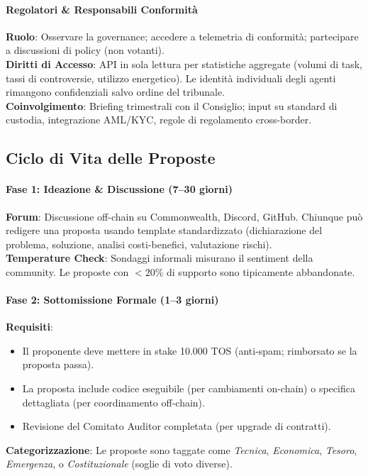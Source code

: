 \documentclass[11pt]{article}
\begin{document}
\begin{itemize}[noitemsep]
\paragraph{Regolatori \& Responsabili Conformità}
\textbf{Ruolo}: Osservare la governance; accedere a telemetria di conformità; partecipare a discussioni di policy (non votanti).\\
\textbf{Diritti di Accesso}: API in sola lettura per statistiche aggregate (volumi di task, tassi di controversie, utilizzo energetico). Le identità individuali degli agenti rimangono confidenziali salvo ordine del tribunale.\\
\textbf{Coinvolgimento}: Briefing trimestrali con il Consiglio; input su standard di custodia, integrazione AML/KYC, regole di regolamento cross-border.

\subsection{Ciclo di Vita delle Proposte}

\paragraph{Fase 1: Ideazione \& Discussione (7--30 giorni)}
\textbf{Forum}: Discussione off-chain su Commonwealth, Discord, GitHub. Chiunque può redigere una proposta usando template standardizzato (dichiarazione del problema, soluzione, analisi costi-benefici, valutazione rischi).\\
\textbf{Temperature Check}: Sondaggi informali misurano il sentiment della community. Le proposte con $<20\%$ di supporto sono tipicamente abbandonate.

\paragraph{Fase 2: Sottomissione Formale (1--3 giorni)}
\textbf{Requisiti}:
\begin{itemize}[noitemsep]
  \item Il proponente deve mettere in stake 10.000 TOS (anti-spam; rimborsato se la proposta passa).
  \item La proposta include codice eseguibile (per cambiamenti on-chain) o specifica dettagliata (per coordinamento off-chain).
  \item Revisione del Comitato Auditor completata (per upgrade di contratti).
\end{itemize}
\textbf{Categorizzazione}: Le proposte sono taggate come \emph{Tecnica}, \emph{Economica}, \emph{Tesoro}, \emph{Emergenza}, o \emph{Costituzionale} (soglie di voto diverse).


\end{itemize}
\end{document}
